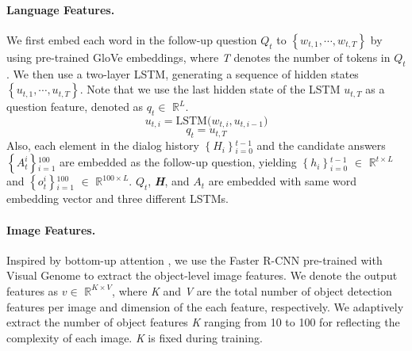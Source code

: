 \documentclass[11pt,a4paper]{article}
\begin{document}
\paragraph{Language Features.} We first embed each word in the follow-up question {\bf{\it $Q_t$}} to {\it $\left\{w_{t,1}, \cdots, w_{t,T} \right\}$} by using pre-trained GloVe \cite{pennington2014glove} embeddings, where {\it T} denotes the number of tokens in {\bf{\it $Q_t$}}. We then use a two-layer LSTM, generating a sequence of hidden states {\it $\left\{u_{t,1}, \cdots, u_{t,T} \right\}$}. Note that we use the last hidden state of the LSTM $u_{t,T}$ as a question feature, denoted as $q_{t} \in$ $\mathbb{R}^{L}$.  
\begin{equation}
    {u_{t,i}} = \mathrm{LSTM(} {w_{t,i}}, {u_{t, i-1}} \mathrm{)}
\end{equation} 
\begin{equation}
    {q_{t}} = {u_{t,T}}
\end{equation} 
Also, each element in the dialog history {\it $\left\{H_{i} \right\}$$_{i=0}^{t-1}$} and the candidate answers {\it $\left\{A_{t}^i \right\}$$_{i=1}^{100}$} are embedded as the follow-up question, yielding {\it $\left\{h_{i} \right\}$$_{i=0}^{t-1}$} $\in$ $\mathbb{R}^{t \times L}$  and {\it $\left\{o_{t}^i \right\}$$_{i=1}^{100}$} $\in$ $\mathbb{R}^{100 \times L}$. {\bf{\it $Q_t$}}, {\bf{\it H}}, and {\bf{\it $A_t$}} are embedded with same word embedding vector and three different LSTMs.

\paragraph{Image Features.} Inspired by bottom-up attention \cite{Anderson2017up-down}, we use the Faster R-CNN \cite{ren2015faster} pre-trained with Visual Genome \cite{krishna2017visual} to extract the object-level image features. We denote the output features as $ v \in$ $\mathbb{R}^{K \times V}$, where {\it K} and {\it V} are the total number of object detection features per image and dimension of the each feature, respectively. We adaptively extract the number of object features {\it K} ranging from 10 to 100 for reflecting the complexity of each image. {\it K} is fixed during training.
\end{document}

